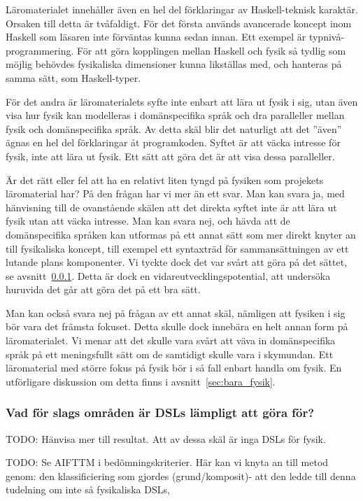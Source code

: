 \begin{binge}
Läromaterialet innehåller även en hel del förklaringar av Haskell-teknisk
karaktär. Orsaken till detta är tvåfaldigt. För det första används avancerade
koncept inom Haskell som läsaren inte förväntas kunna sedan innan. Ett exempel
är typnivå-programmering. För att göra kopplingen mellan Haskell och fysik så
tydlig som möjlig behövdes fysikaliska dimensioner kunna likställas med, och
hanteras på samma sätt, som Haskell-typer.

För det andra är läromaterialets syfte inte enbart att lära ut fysik i sig, utan
även visa hur fysik kan modelleras i domänspecifika språk och dra paralleller
mellan fysik och domänspecifika språk. Av detta skäl blir det naturligt att det
''även'' ägnas en hel del förklaringar åt programkoden. Syftet är att väcka
intresse för fysik, inte att lära ut fysik. Ett sätt att göra det är att visa
dessa paralleller.

Är det rätt eller fel att ha en relativt liten tyngd på fysiken som projekets
läromaterial har? På den frågan har vi mer än ett svar. Man kan svara ja, med
hänvisning till de ovanstående skälen att det direkta syftet inte är att lära ut
fysik utan att väcka intresse. Man kan svara nej, och hävda att de
domänspecifika språken kan utformas på ett annat sätt som mer direkt knyter an
till fysikaliska koncept, till exempel ett syntaxträd för sammansättningen av
ett lutande plans komponenter. Vi tyckte dock det var svårt att göra på det
sättet, se avsnitt~\ref{sec:lampligt}. Detta är dock en
vidareutvecklingspotential, att undersöka huruvida det går att göra det på ett
bra sätt.

Man kan också svara nej på frågan av ett annat skäl, nämligen att fysiken i sig
bör vara det främsta fokuset. Detta skulle dock innebära en helt annan form på
läromaterialet. Vi menar att det skulle vara svårt att väva in domänspecifika
språk på ett meningsfullt sätt om de samtidigt skulle vara i skymundan. Ett
läromaterial med större fokus på fysik bör i så fall enbart handla om fysik. En
utförligare diskussion om detta finns i avsnitt~\ref{sec:bara_fysik}.

\subsubsection{Vad för slags områden är DSLs lämpligt att göra för?}
\label{sec:lampligt}

TODO: Hänvisa mer till resultat. Att av dessa skäl är inga DSLs för fysik.

TODO: Se AIFTTM i bedömningskriterier. Här kan vi knyta an till metod genom: den
klassificiering som gjordes (grund/komposit)- att den ledde till denna tudelning
om inte så fysikaliska DSLs, 


\end{binge}
